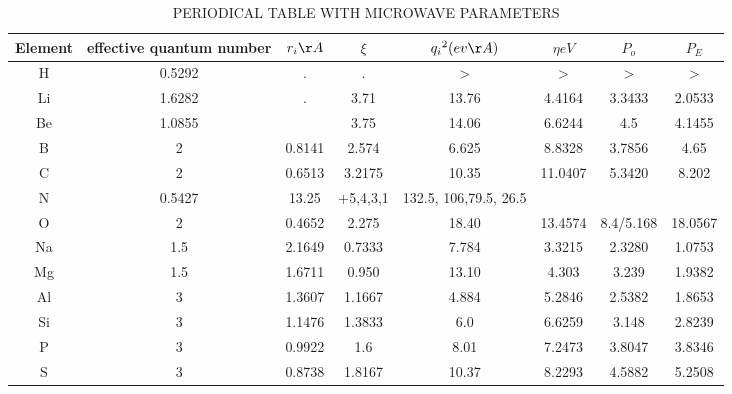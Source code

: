 \documentclass[journal]{IEEEtran}
\begin{document}
	\begin{longtable}{|c|c|c|c|c|c|c|c|}
	\caption{PERIODICAL TABLE WITH MICROWAVE PARAMETERS}\\
	
	\endfirsthead
	 \endhead
			Element & effective quantum number&  $r_i\AA $ &  $\xi$ &  ${q_i}^2(ev\AA)$  & $\eta eV$  &  $P_o$ & $P_E$  \\ 
		\hline
		H & 0.5292 & .& .& > & > & >  &  > \\
		\hline
		Li & 1.6282 & . &3.71 & 13.76 & 4.4164 & 3.3433 & 2.0533 \\ 
		\hline 
		Be & 1.0855 & & 3.75 & 14.06 & 6.6244 & 4.5 & 4.1455	 \\ 
		\hline 
		B & 2 & 0.8141 & 2.574 & 6.625 & 8.8328 & 3.7856 & 4.65 \\
		\hline 
		C & 2  & 0.6513 &  3.2175 & 10.35 & 11.0407 & 5.3420  & 8.202 \\ 
		\hline 
		N & 0.5427 & 13.25 & +5,4,3,1 & 132.5,  106,79.5,  26.5 \\ 
		\hline 
		O & 2 & 0.4652  & 2.275  & 18.40 & 13.4574  & 8.4/5.168 & 18.0567 \\ 
		\hline 
		Na & 1.5 & 2.1649 & 0.7333 & 7.784 & 3.3215 & 2.3280 & 1.0753 \\
		\hline
		Mg & 1.5 & 1.6711 & 0.950  & 13.10 & 4.303 & 3.239 & 1.9382 \\ 
		\hline 
		Al & 3 & 1.3607 & 1.1667 & 4.884 & 5.2846 & 2.5382 & 1.8653 \\ 
		\hline 
		Si & 3 &  1.1476 & 1.3833 & 6.0 & 6.6259 & 3.148 & 2.8239 \\ 
		\hline 
		P & 3 & 0.9922 & 1.6 & 8.01 & 7.2473 & 3.8047 & 3.8346 \\ 
		\hline 
		S & 3 & 0.8738 & 1.8167  & 10.37  & 8.2293 & 4.5882 & 5.2508 \\ 
		\hline 
		

\end{longtable}
\end{document}
